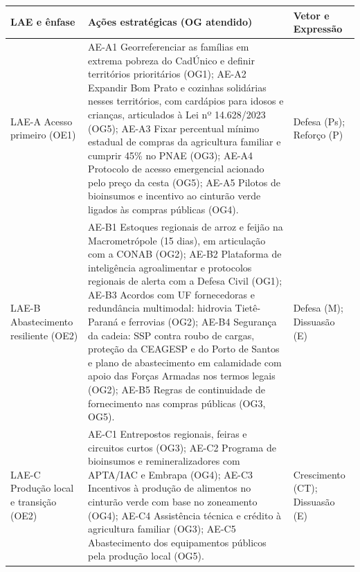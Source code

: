 \documentclass[
	12pt,				%
	openright,			%
	oneside,			%
	a4paper,			%
	chapter=TITLE,		%
	section=TITLE,		%
	english,			%
	french,				%
	spanish,			%
	brazil,				%
 ]{abntex2}
\begin{document}
\begin{quadro}[!htbp]
\centering
\caption{Linhas de ação estratégicas alternativas e ações estratégicas}
\label{qua:lae-propostas}
\footnotesize
\renewcommand{\arraystretch}{1.05}
\setlength{\tabcolsep}{3pt}
\begin{tabularx}{\textwidth}{|>{\raggedright\arraybackslash}p{2.6cm}|>{\raggedright\arraybackslash}X|>{\raggedright\arraybackslash}p{2.4cm}|}
\hline
\textbf{LAE e ênfase} & \textbf{Ações estratégicas (OG atendido)} & \textbf{Vetor e Expressão} \\
\hline
LAE-A Acesso primeiro (OE1) &
AE-A1 Georreferenciar as famílias em extrema pobreza do CadÚnico e definir territórios prioritários (OG1); AE-A2 Expandir Bom Prato e cozinhas solidárias nesses territórios, com cardápios para idosos e crianças, articulados à Lei nº 14.628/2023 (OG5); AE-A3 Fixar percentual mínimo estadual de compras da agricultura familiar e cumprir 45\% no PNAE (OG3); AE-A4 Protocolo de acesso emergencial acionado pelo preço da cesta (OG5); AE-A5 Pilotos de bioinsumos e incentivo ao cinturão verde ligados às compras públicas (OG4). &
Defesa (Ps); Reforço (P) \\
\hline
LAE-B Abastecimento resiliente (OE2) &
AE-B1 Estoques regionais de arroz e feijão na Macrometrópole (15 dias), em articulação com a CONAB (OG2); AE-B2 Plataforma de inteligência agroalimentar e protocolos regionais de alerta com a Defesa Civil (OG1); AE-B3 Acordos com UF fornecedoras e redundância multimodal: hidrovia Tietê-Paraná e ferrovias (OG2); AE-B4 Segurança da cadeia: SSP contra roubo de cargas, proteção da CEAGESP e do Porto de Santos e plano de abastecimento em calamidade com apoio das Forças Armadas nos termos legais (OG2); AE-B5 Regras de continuidade de fornecimento nas compras públicas (OG3, OG5). &
Defesa (M); Dissuasão (E) \\
\hline
LAE-C Produção local e transição (OE2) &
AE-C1 Entrepostos regionais, feiras e circuitos curtos (OG3); AE-C2 Programa de bioinsumos e remineralizadores com APTA/IAC e Embrapa (OG4); AE-C3 Incentivos à produção de alimentos no cinturão verde com base no zoneamento (OG4); AE-C4 Assistência técnica e crédito à agricultura familiar (OG3); AE-C5 Abastecimento dos equipamentos públicos pela produção local (OG5). &
Crescimento (CT); Dissuasão (E) \\
\hline
\end{tabularx}
\end{quadro}
\end{document}
